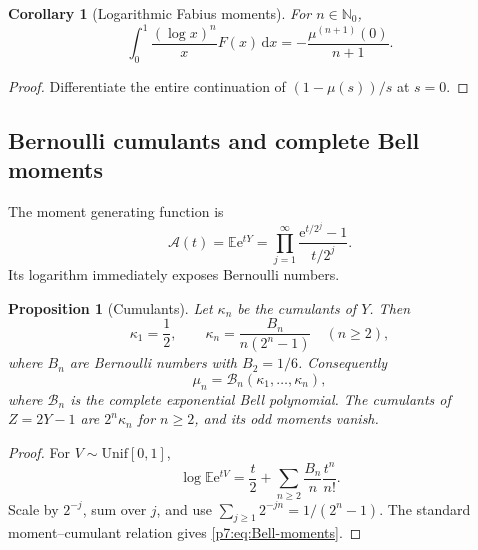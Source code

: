 \documentclass[11pt,oneside]{article}
\newtheorem{proposition}[theorem]{Proposition}
\newtheorem{corollary}[theorem]{Corollary}
\theoremstyle{definition}
\theoremstyle{remark}
\newcommand{\E}{\mathbb E}
\newcommand{\N}{\mathbb N}
\newcommand{\dd}{\,\mathrm d}
\newcommand{\e}{\mathrm e}
\newcommand{\1}{\mathbf 1}
\begin{document}
\begin{corollary}[Logarithmic Fabius moments]
For $n\in\N_0$,
\begin{equation}
 \int_0^1\frac{(\log x)^n}{x}F(x)\dd x
 =-\frac{\mu^{(n+1)}(0)}{n+1}.
 \label{p7:eq:log-F-moments}
\end{equation}
\end{corollary}

\begin{proof}
Differentiate the entire continuation of $(1-\mu(s))/s$ at $s=0$.
\end{proof}

\subsection{Bernoulli cumulants and complete Bell moments}

The moment generating function is
\begin{equation}
 \mathscr A(t)=\E\e^{tY}
 =\prod_{j=1}^{\infty}\frac{\e^{t/2^j}-1}{t/2^j}.
 \label{p7:eq:Y-mgf}
\end{equation}
Its logarithm immediately exposes Bernoulli numbers.

\begin{proposition}[Cumulants]
\label{p7:prop:cumulants}
Let $\kappa_n$ be the cumulants of $Y$.  Then
\begin{equation}
 \kappa_1=\frac12,
 \qquad
 \kappa_n=\frac{B_n}{n(2^n-1)}\quad(n\ge2),
 \label{p7:eq:Y-cumulants}
\end{equation}
where $B_n$ are Bernoulli numbers with $B_2=1/6$.  Consequently
\begin{equation}
 \mu_n=\mathcal B_n(\kappa_1,\ldots,\kappa_n),
 \label{p7:eq:Bell-moments}
\end{equation}
where $\mathcal B_n$ is the complete exponential Bell polynomial.  The cumulants of
$Z=2Y-1$ are $2^n\kappa_n$ for $n\ge2$, and its odd moments vanish.
\end{proposition}

\begin{proof}
For $V\sim\mathrm{Unif}[0,1]$,
\[
 \log\E\e^{tV}=\frac t2+\sum_{n\ge2}\frac{B_n}{n}\frac{t^n}{n!}.
\]
Scale by $2^{-j}$, sum over $j$, and use
$\sum_{j\ge1}2^{-jn}=1/(2^n-1)$.  The standard moment--cumulant relation gives
\cref{p7:eq:Bell-moments}.
\end{proof}

\begin{table}[H]
\centering
\caption{Exact moments generated from Bernoulli cumulants.}
\label{p7:tab:moments}

\end{table}
\end{document}
